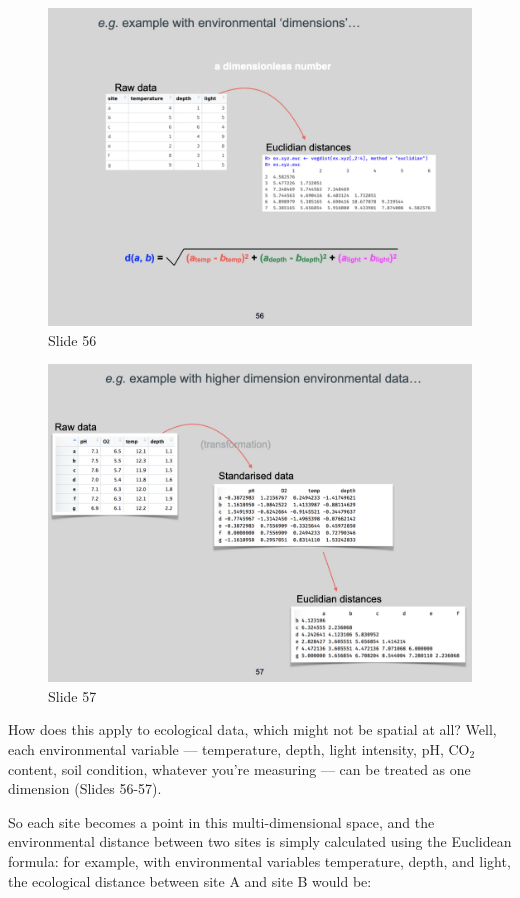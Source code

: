 \documentclass[
  10pt,
]{book}
\begin{document}
\begin{figure}[ht]
\centering
\includegraphics[width=0.8\linewidth]{../images/BDC334/BDC334-056.jpeg}
\caption*{Slide 56}
\end{figure}

\begin{figure}[ht]
\centering
\includegraphics[width=0.8\linewidth]{../images/BDC334/BDC334-057.jpeg}
\caption*{Slide 57}
\end{figure}

How does this apply to ecological data, which might not be spatial at
all? Well, each environmental variable --- temperature, depth, light
intensity, pH, CO\(_2\) content, soil condition, whatever you're
measuring --- can be treated as one dimension (Slides 56-57).

So each site becomes a point in this multi-dimensional space, and the
environmental distance between two sites is simply calculated using the
Euclidean formula: for example, with environmental variables
temperature, depth, and light, the ecological distance between site A
and site B would be:
\end{document}
